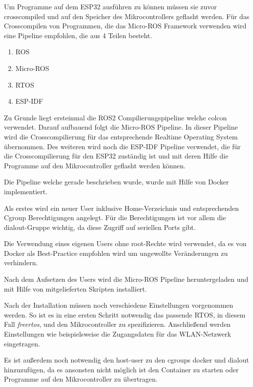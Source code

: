 \begin{flushleft}


    Um Programme auf dem ESP32 ausführen zu können müssen sie zuvor crosscompiled und auf den Speicher des Mikrocontrollers geflasht werden.
    Für das Crosscompilen von Programmen, die das Micro-ROS Framework verwenden wird eine Pipeline empfohlen, die aus 4 Teilen besteht.
    \begin{enumerate}
        \item ROS
        \item Micro-ROS
        \item RTOS
        \item ESP-IDF
    \end{enumerate}

    Zu Grunde liegt ersteinmal die ROS2 Compilierungspipeline welche colcon verwendet.
    Darauf aufbauend folgt die Micro-ROS Pipeline. In dieser Pipeline wird die Crosscompilierung für das entsprechende Realtime Operating System übernommen.
    Des weiteren wird noch die ESP-IDF Pipeline verwendet, die für die Crosscompilierung für den ESP32 zuständig ist und mit deren Hilfe die Programme auf den Mikrocontroller geflasht werden können.

    Die Pipeline welche gerade beschrieben wurde, wurde mit Hilfe von Docker implementiert.

    Als erstes wird ein neuer User inklusive Home-Verzeichnis und entsprechenden Cgroup Berechtigungen angelegt.
    Für die Berechtigungen ist vor allem die dialout-Gruppe wichtig, da diese Zugriff auf seriellen Ports gibt.

    Die Verwendung eines eigenen Users ohne root-Rechte wird verwendet, 
    da es von Docker als Best-Practice empfohlen wird um ungewollte Veränderungen zu verhindern.


    Nach dem Aufsetzen des Users wird die Micro-ROS Pipeline heruntergeladen und mit Hilfe von mitgelieferten Skripten installiert.

    Nach der Installation müssen noch verschiedene Einstellungen vorgenommen werden. So ist es in eine ersten Schritt notwendig das passende RTOS, in diesem Fall \textit{freertos},
    und den Mikrocontroller zu spezifizieren. Anschließend werden Einstellungen wie beispielsweise die Zugangsdaten für das WLAN-Netzwerk eingetragen.

    Es ist außerdem noch notwendig den host-user zu den cgroups docker und dialout hinzuzufügen, 
    da es ansonsten nicht möglich ist den Container zu starten oder Programme auf den Mikrocontroller zu übertragen.



\end{flushleft}
